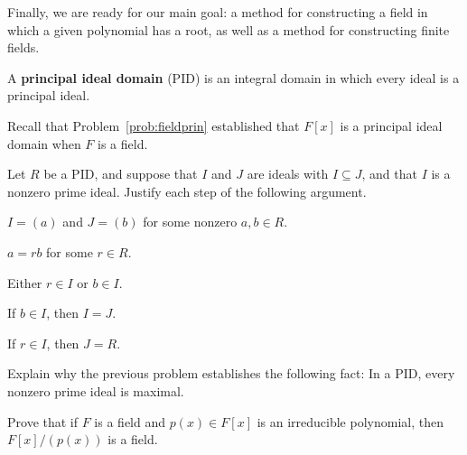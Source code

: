 Finally, we are ready for our main goal: a method for constructing a field in which a given polynomial has a root, as well as a method for constructing finite fields.

\begin{definition}
A \textbf{principal ideal domain} (PID) is an integral domain in which every ideal is a principal ideal.
\end{definition}

Recall that Problem~\ref{prob:fieldprin} established that \(F[x]\) is a principal ideal domain when \(F\) is a field.

\begin{problem}
Let \(R\) be a PID, and suppose that \(I\) and \(J\) are ideals with \(I \subseteq J\), and that \(I\) is a nonzero prime ideal. Justify each step of the following argument.
\begin{problemparts}
  \item \(I = (a)\) and \(J = (b)\) for some nonzero \(a,b \in R\).
  \item \(a = rb\) for some \(r \in R\).
  \item Either \(r \in I\) or \(b \in I\).
  \item If \(b \in I\), then \(I = J\).
  \item If \(r \in I\), then \(J = R\).
  \end{problemparts}
\end{problem}

\begin{problem}
Explain why the previous problem establishes the following fact: In a PID, every nonzero prime ideal is maximal.
\end{problem}

\begin{problem}\label{prob:fieldconstruction}
Prove that if \(F\) is a field and \(p(x) \in F[x]\) is an irreducible polynomial, then \(F[x]/(p(x))\) is a field.
\begin{annotation}
\end{annotation}
\end{problem}

